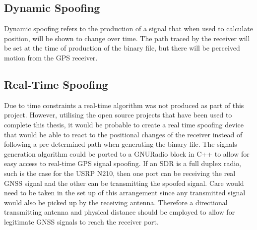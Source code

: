 \subsection{Dynamic Spoofing}
Dynamic spoofing refers to the production of a signal that when used to calculate position, will be shown to change over time. The path traced by the receiver will be
set at the time of production of the binary file, but there will be perceived motion from the GPS receiver.

\subsection{Real-Time Spoofing}
Due to time constraints a real-time algorithm was not produced as part of this project. However, utilising the open source projects that have been used to complete this
thesis, it would be probable to create a real time spoofing device that would be able to react to the positional changes of the receiver instead of following a
pre-determined path when generating the binary file. The signals generation algorithm could be ported to a GNURadio block in C++ to allow for easy access to real-time GPS
signal spoofing. If an SDR is a full duplex radio, such is the case for the USRP N210, then one port can be receiving the real GNSS signal and the other can be
transmitting the spoofed signal. Care would need to be taken in the set up of this arrangement since any transmitted signal would also be picked up by the receiving
antenna. Therefore a directional transmitting antenna and physical distance should be employed to allow for legitimate GNSS signals to reach the receiver port. 
